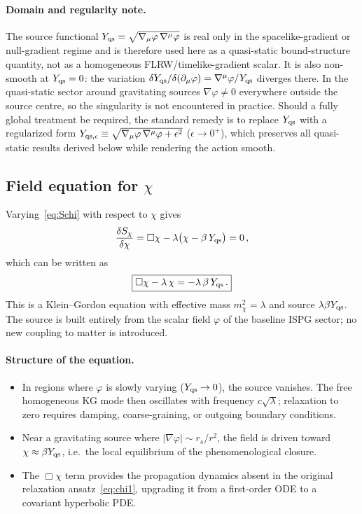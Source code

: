 \documentclass[11pt]{article}
\begin{document}
\paragraph{Domain and regularity note.}
The source functional
$Y_{\rm qs} = \sqrt{\nabla_\mu\varphi\,\nabla^\mu\varphi}$
is real only in the spacelike-gradient or null-gradient regime and is
therefore used here as a quasi-static bound-structure quantity, not as
a homogeneous FLRW/timelike-gradient scalar.  It is also non-smooth at
$Y_{\rm qs} = 0$: the variation
$\delta Y_{\rm qs}/\delta(\partial_\mu\varphi) =
\nabla^\mu\varphi/Y_{\rm qs}$
diverges there.  In the quasi-static sector around
gravitating sources $\nabla\varphi \neq 0$ everywhere
outside the source centre, so the singularity is not
encountered in practice.  Should a fully global treatment
be required, the standard remedy is to replace $Y_{\rm qs}$ with
a regularized form
$Y_{{\rm qs},\epsilon} \equiv
\sqrt{\nabla_\mu\varphi\,\nabla^\mu\varphi
+ \epsilon^2}$ ($\epsilon \to 0^+$), which preserves all
quasi-static results derived below while rendering the action smooth.

\subsection{Field equation for $\chi$}\label{sec:chi_eom}
Varying~\eqref{eq:Schi} with respect to $\chi$ gives
\begin{equation}
\frac{\delta S_\chi}{\delta\chi}
= \Box\chi - \lambda\bigl(\chi - \beta\,Y_{\rm qs}\bigr) = 0\,,
\label{eq:chi_eom}
\end{equation}
which can be written as
\begin{equation}
\boxed{\Box\chi - \lambda\,\chi = -\lambda\,\beta\,Y_{\rm qs}\,.}
\label{eq:chi_KG}
\end{equation}
This is a Klein--Gordon equation with effective
mass $m_\chi^2 = \lambda$ and source $\lambda\beta Y_{\rm qs}$.
The source is built entirely from the scalar field
$\varphi$ of the baseline ISPG sector; no new coupling
to matter is introduced.

\paragraph{Structure of the equation.}
\begin{itemize}
\item In regions where $\varphi$ is slowly varying
  ($Y_{\rm qs} \to 0$), the source vanishes.  The free
  homogeneous KG mode then oscillates with frequency
  $c\sqrt{\lambda}$; relaxation to zero requires
  damping, coarse-graining, or outgoing boundary
  conditions.
\item Near a gravitating source where
  $|\nabla\varphi| \sim r_s/r^2$, the field is driven
  toward $\chi \approx \beta Y_{\rm qs}$, i.e.\ the local
  equilibrium of the phenomenological closure.
\item The $\Box\chi$ term provides the propagation dynamics
  absent in the original relaxation ansatz~\eqref{eq:chi1},
  upgrading it from a first-order ODE to a covariant
  hyperbolic PDE.
\end{itemize}
\end{document}
